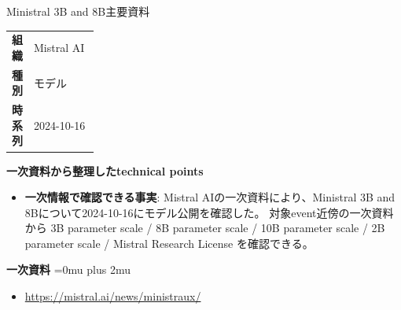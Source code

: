 \begin{technicalnote}{Ministral 3B and 8B}{主要資料}
\begingroup
\begin{tabularx}{\linewidth}{@{}>{\bfseries}p{0.22\linewidth}X@{}}
組織 & Mistral AI \\
種別 & モデル \\
時系列 & 2024-10-16 \\
\end{tabularx}
\smallskip
{\bfseries 一次資料から整理したtechnical points}
\begin{itemize}[leftmargin=1.5em,itemsep=0.35em]
\item \textbf{一次情報で確認できる事実}: Mistral AIの一次資料により、Ministral 3B and 8Bについて2024-10-16にモデル公開を確認した。 対象event近傍の一次資料から 3B parameter scale / 8B parameter scale / 10B parameter scale / 2B parameter scale / Mistral Research License を確認できる。
\end{itemize}
\begin{minipage}{\linewidth}
\begin{samepage}
{\bfseries 一次資料}
\begingroup\sloppy
\Urlmuskip=0mu plus 2mu\relax
\begin{itemize}[leftmargin=1.5em,itemsep=0.25em]
\item {\scriptsize\url{https://mistral.ai/news/ministraux/}}
\end{itemize}
\endgroup
\end{samepage}
\end{minipage}
\endgroup
\end{technicalnote}
\medskip

